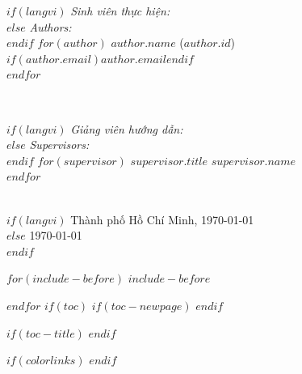 \documentclass[a4paper, 12pt]{article}
\begin{document}
\begin{titlepage}
\begin{minipage}{0.4\textwidth}
\begin{flushleft} \large
$if(langvi)$
\emph{Sinh viên thực hiện:}\\
$else$
\emph{Authors:}\\
$endif$
$for(author)$
$author.name$ ($author.id$)\\
$if(author.email)$$author.email$$endif$\\
$endfor$
\end{flushleft}
\end{minipage}
~
\begin{minipage}{0.4\textwidth}
\begin{flushright} \large
$if(langvi)$
\emph{Giảng viên hướng dẫn:} \\
$else$
\emph{Supervisors:} \\
$endif$
$for(supervisor)$
$supervisor.title$ $supervisor.name$ \\
$endfor$
\end{flushright}
\end{minipage}\\[2cm]

$if(langvi)$
{\large Thành phố Hồ Chí Minh, \today}\\[2cm] %
$else$
{\large \today}\\[2cm] %
$endif$

\vfill %
\end{titlepage}

$for(include-before)$
$include-before$

$endfor$
$if(toc)$
$if(toc-newpage)$
\clearpage
$endif$

$if(toc-title)$
\renewcommand*\contentsname{$toc-title$}
$endif$

{
$if(colorlinks)$
\hypersetup{linkcolor=$if(toccolor)$$toccolor$$else$blue$endif$}
$endif$

\setcounter{tocdepth}{$toc-depth$}

\vspace*{1cm}

\tableofcontents

\vspace*{1cm}
}
\end{document}
